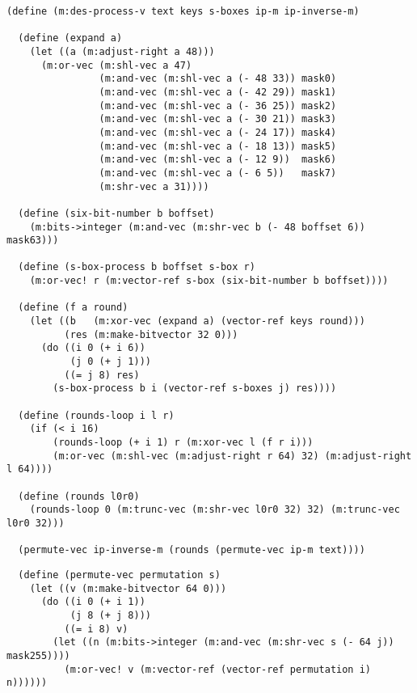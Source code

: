 
\topmargin      -1.0cm
\oddsidemargin  -2.0cm
\evensidemargin -2.0cm
\textwidth       8.0in
\textheight      11.0in



\Large
\begin{verbatim}
(define (m:des-process-v text keys s-boxes ip-m ip-inverse-m)

  (define (expand a)
    (let ((a (m:adjust-right a 48)))
      (m:or-vec (m:shl-vec a 47)
                (m:and-vec (m:shl-vec a (- 48 33)) mask0)
                (m:and-vec (m:shl-vec a (- 42 29)) mask1)
                (m:and-vec (m:shl-vec a (- 36 25)) mask2)
                (m:and-vec (m:shl-vec a (- 30 21)) mask3)
                (m:and-vec (m:shl-vec a (- 24 17)) mask4)
                (m:and-vec (m:shl-vec a (- 18 13)) mask5)
                (m:and-vec (m:shl-vec a (- 12 9))  mask6)
                (m:and-vec (m:shl-vec a (- 6 5))   mask7)
                (m:shr-vec a 31))))

  (define (six-bit-number b boffset)
    (m:bits->integer (m:and-vec (m:shr-vec b (- 48 boffset 6)) mask63)))

  (define (s-box-process b boffset s-box r)
    (m:or-vec! r (m:vector-ref s-box (six-bit-number b boffset))))

  (define (f a round)
    (let ((b   (m:xor-vec (expand a) (vector-ref keys round)))
          (res (m:make-bitvector 32 0)))
      (do ((i 0 (+ i 6))
           (j 0 (+ j 1)))
          ((= j 8) res)
        (s-box-process b i (vector-ref s-boxes j) res))))

  (define (rounds-loop i l r)
    (if (< i 16)
        (rounds-loop (+ i 1) r (m:xor-vec l (f r i)))
        (m:or-vec (m:shl-vec (m:adjust-right r 64) 32) (m:adjust-right l 64))))

  (define (rounds l0r0)
    (rounds-loop 0 (m:trunc-vec (m:shr-vec l0r0 32) 32) (m:trunc-vec l0r0 32)))

  (permute-vec ip-inverse-m (rounds (permute-vec ip-m text))))
\end{verbatim}

\pagebreak

\begin{verbatim}
  (define (permute-vec permutation s)
    (let ((v (m:make-bitvector 64 0)))
      (do ((i 0 (+ i 1))
           (j 8 (+ j 8)))
          ((= i 8) v)
        (let ((n (m:bits->integer (m:and-vec (m:shr-vec s (- 64 j)) mask255))))
          (m:or-vec! v (m:vector-ref (vector-ref permutation i) n))))))

\end{verbatim}


